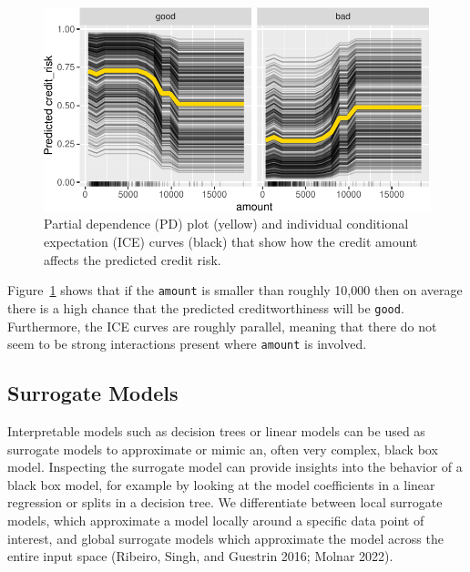 \begin{Shaded}
\begin{Highlighting}[]
\OtherTok{=}\SpecialCharTok{$} \NormalTok{,}
   \NormalTok{)}
\SpecialCharTok{$}\NormalTok{()}
\end{Highlighting}
\end{Shaded}

\begin{figure}[H]

{\centering \includegraphics[width=1\textwidth,height=\textheight]{chapters/chapter12/model_interpretation_files/figure-pdf/fig-iml-pdice-1.pdf}

}

\caption{\label{fig-iml-pdice}Partial dependence (PD) plot (yellow) and
individual conditional expectation (ICE) curves (black) that show how
the credit amount affects the predicted credit risk.}

\end{figure}

Figure~\ref{fig-iml-pdice} shows that if the \texttt{amount} is smaller
than roughly 10,000 then on average there is a high chance that the
predicted creditworthiness will be \texttt{good}. Furthermore, the ICE
curves are roughly parallel, meaning that there do not seem to be strong
interactions present where \texttt{amount} is involved.

\hypertarget{surrogate-models-1}{%
\subsection{Surrogate Models}\label{surrogate-models-1}}

Interpretable models such as decision trees or linear models can be used
as surrogate models to approximate or mimic an,
often very complex, black box model. Inspecting the surrogate model can
provide insights into the behavior of a black box model, for example by
looking at the model coefficients in a linear regression or splits in a
decision tree. We differentiate between local surrogate models, which
approximate a model locally around a specific data point of interest,
and global surrogate models which approximate the model across the
entire input space (Ribeiro, Singh, and Guestrin 2016; Molnar 2022).

